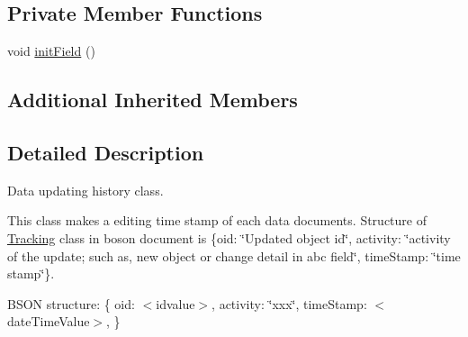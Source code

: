 \subsection*{Private Member Functions}
\begin{DoxyCompactItemize}
\item 
void \hyperlink{classunisys_1_1Tracking_ae8e471c1d4effb3c746e654ba1c970ba}{init\-Field} ()
\end{DoxyCompactItemize}
\subsection*{Additional Inherited Members}


\subsection{Detailed Description}
Data updating history class. 

This class makes a editing time stamp of each data documents. Structure of \hyperlink{classunisys_1_1Tracking}{Tracking} class in boson document is \{oid\-: \char`\"{}\-Updated object id\char`\"{}, activity\-: \char`\"{}activity of the update; such as, new object or change detail in abc field\char`\"{}, time\-Stamp\-: \char`\"{}time stamp\char`\"{}\}.

B\-S\-O\-N structure\-: \{ oid\-: $<$idvalue$>$, activity\-: \char`\"{}xxx\char`\"{}, time\-Stamp\-: $<$date\-Time\-Value$>$, \} 

